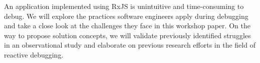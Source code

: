 An application implemented using RxJS is unintuitive and time-consuming to debug. We will explore the practices software engineers apply during debugging and take a close look at the challenges they face in this workshop paper. On the way to propose solution concepts, we will validate previously identified struggles in an observational study and elaborate on previous research efforts in the field of reactive debugging.

